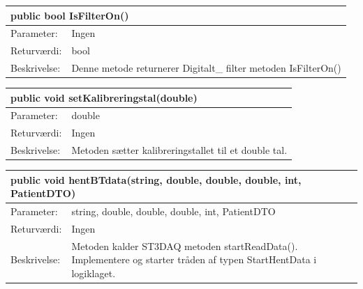 \begin{table}[H]
\label{tab:tabel2}
\begin{tabular}{| l | p{13cm} |}
   \hline
   \multicolumn{2}{|l|}{public bool IsFilterOn()} \\ \hline
   Parameter: & Ingen\\ \hline
   Returværdi: & bool\\ \hline
   Beskrivelse: & Denne metode returnerer Digitalt\_ filter metoden IsFilterOn() \\ \hline
\end{tabular}
\end{table}
\begin{table}[H]
\label{tab:tabel2}
\begin{tabular}{| l | p{13cm} |}
   \hline
   \multicolumn{2}{|l|}{public void setKalibreringstal(double)} \\ \hline
   Parameter: & double\\ \hline
   Returværdi: & Ingen\\ \hline
   Beskrivelse: & Metoden sætter kalibreringstallet til et double tal. \\ \hline
\end{tabular}
\end{table}
\begin{table}[H]
\label{tab:tabel2}
\begin{tabular}{| l | p{13cm} |}
   \hline
   \multicolumn{2}{|l|}{public void hentBTdata(string, double, double, double, int, PatientDTO)} \\ \hline
   Parameter: & string, double, double, double, int, PatientDTO\\ \hline
   Returværdi: & Ingen\\ \hline
   Beskrivelse: & Metoden kalder ST3DAQ metoden startReadData(). Implementere og starter tråden af typen StartHentData i logiklaget.\\ \hline
\end{tabular}
\end{table}
